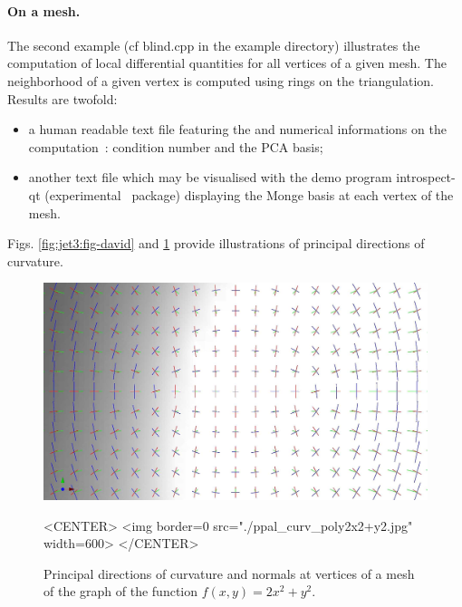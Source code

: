 \paragraph{On a mesh.}
The second example (cf blind.cpp in the example directory) illustrates
the computation of local differential quantities for all vertices of a
given mesh. The neighborhood of a given vertex is computed using rings on
the triangulation. Results are twofold:
\begin{itemize}
\item
a human readable text file featuring the  and
numerical informations on the computation~: condition number and the
PCA basis;
\item another text file which may be visualised with the demo program
  introspect-qt (experimental \cgal\ package) displaying the Monge
  basis at each vertex of the mesh.
\end{itemize}



Figs.
\ref{fig:jet3:fig-david} and
\ref{fig:jet3:fig-elliptic-paraboloid}
provide illustrations of principal directions of curvature.



 

\begin{figure}[!ht]
\begin{ccTexOnly}
\centerline{
\includegraphics[width=.5\linewidth]{Jet_fitting_3/ppal_curv_poly2x2+y2}}
\end{ccTexOnly}
\caption{Principal directions of curvature and normals at vertices of a mesh of the
 graph of the function $f(x,y)=2x^2+y^2$.}

\begin{ccHtmlOnly}
<CENTER> <img border=0 src="./ppal_curv_poly2x2+y2.jpg" width=600>
</CENTER>
\end{ccHtmlOnly}
\label{fig:jet3:fig-elliptic-paraboloid}
\end{figure}

